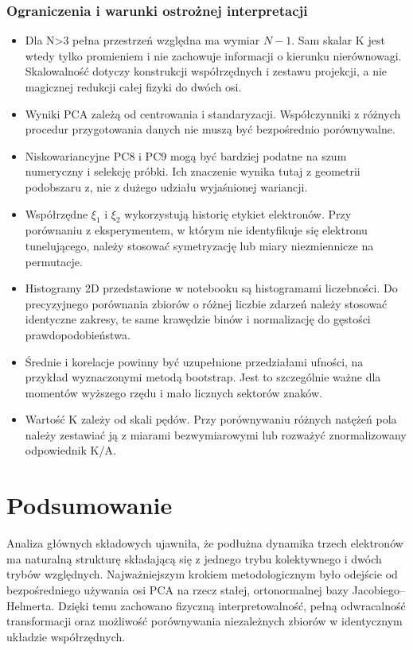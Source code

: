 \documentclass[12pt,letterpaper,oneside]{report}
\numberwithin{equation}{chapter}
\numberwithin{figure}{chapter}
\numberwithin{table}{chapter}
\begin{document}
\subsection{Ograniczenia i warunki ostrożnej interpretacji}

\begin{itemize}
\item
  Dla N\textgreater3 pełna przestrzeń względna ma wymiar \ensuremath{N-1}. Sam skalar
  K jest wtedy tylko promieniem i nie zachowuje informacji o kierunku
  nierównowagi. Skalowalność dotyczy konstrukcji współrzędnych i zestawu
  projekcji, a nie magicznej redukcji całej fizyki do dwóch osi.
\item
  Wyniki PCA zależą od centrowania i standaryzacji. Współczynniki z
  różnych procedur przygotowania danych nie muszą być bezpośrednio
  porównywalne.
\item
  Niskowariancyjne PC8 i PC9 mogą być bardziej podatne na szum
  numeryczny i selekcję próbki. Ich znaczenie wynika tutaj z geometrii
  podobszaru z, nie z dużego udziału wyjaśnionej wariancji.
\item
  Współrzędne \ensuremath{\xi_1} i \ensuremath{\xi_2} wykorzystują historię etykiet elektronów. Przy
  porównaniu z eksperymentem, w którym nie identyfikuje się elektronu
  tunelującego, należy stosować symetryzację lub miary niezmiennicze na
  permutacje.
\item
  Histogramy 2D przedstawione w notebooku są histogramami liczebności.
  Do precyzyjnego porównania zbiorów o różnej liczbie zdarzeń należy
  stosować identyczne zakresy, te same krawędzie binów i normalizację do
  gęstości prawdopodobieństwa.
\item
  Średnie i korelacje powinny być uzupełnione przedziałami ufności, na
  przykład wyznaczonymi metodą bootstrap. Jest to szczególnie ważne dla
  momentów wyższego rzędu i mało licznych sektorów znaków.
\item
  Wartość K zależy od skali pędów. Przy porównywaniu różnych natężeń
  pola należy zestawiać ją z miarami bezwymiarowymi lub rozważyć
  znormalizowany odpowiednik K/A.
\end{itemize}

\chapter{Podsumowanie}

Analiza głównych składowych ujawniła, że podłużna dynamika trzech
elektronów ma naturalną strukturę składającą się z jednego trybu
kolektywnego i dwóch trybów względnych. Najważniejszym krokiem
metodologicznym było odejście od bezpośredniego używania osi PCA na
rzecz stałej, ortonormalnej bazy Jacobiego--Helmerta. Dzięki temu
zachowano fizyczną interpretowalność, pełną odwracalność transformacji
oraz możliwość porównywania niezależnych zbiorów w identycznym układzie
współrzędnych.
\end{document}
